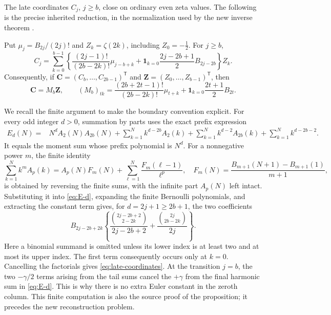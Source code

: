 The late coordinates $C_j$, $j\geq b$, close on ordinary even zeta
values. The following is the precise inherited reduction, in the
normalization used by the new inverse theorem
\cite[Sections 2--3]{incoming-bernoulli}.

\begin{proposition}
\label{prop:late-coordinates}
Put $\mu_j=B_{2j}/(2j)!$ and $Z_k=\zeta(2k)$, including
$Z_0=-\tfrac12$. For $j\geq b$,
\begin{equation}\label{eq:late-coordinates}
 C_j=\sum_{k=0}^{b-1}
 \left\{\frac{(2j-1)!}{(2b-2k)!}\mu_{j-b+k}
 +\mathbf1_{k=0}\frac{2j-2b+1}{2}B_{2j-2b}\right\}Z_k.
\end{equation}
Consequently, if $\mathbf C=(C_b,\ldots,C_{2b-1})^{\mathsf T}$ and
$\mathbf Z=(Z_0,\ldots,Z_{b-1})^{\mathsf T}$, then
\begin{equation}\label{eq:M-system}
 \mathbf C=M_b\mathbf Z,
 \qquad
 (M_b)_{tk}=\frac{(2b+2t-1)!}{(2b-2k)!}\mu_{t+k}
       +\mathbf1_{k=0}\frac{2t+1}{2}B_{2t}.
\end{equation}
\end{proposition}

We recall the finite argument to make the boundary convention explicit.
For every odd integer $d>0$, summation by parts uses the exact prefix
expression
\begin{align}\label{eq:E-d}
 E_d(N)={}&N^dA_2(N)A_{2b}(N)
 +\sum_{k=1}^N k^{d-2b}A_2(k)
 +\sum_{k=1}^N k^{d-2}A_{2b}(k)
 +\sum_{k=1}^N k^{d-2b-2}.
\end{align}
It equals the moment sum whose prefix polynomial is $N^d$.
For a nonnegative power $m$, the finite identity
\begin{equation}\label{eq:faulhaber-tail}
 \sum_{k=1}^N k^m A_p(k)
 =A_p(N)F_m(N)+\sum_{\ell=1}^N\frac{F_m(\ell-1)}{\ell^p},
 \quad F_m(N)=\frac{B_{m+1}(N+1)-B_{m+1}(1)}{m+1},
\end{equation}
is obtained by reversing the finite sums, with the infinite part
$A_p(N)$ left intact. Substituting it into \eqref{eq:E-d}, expanding
the finite Bernoulli polynomials, and extracting the constant term
gives, for $d=2j+1\geq2b+1$, the two coefficients
\[
 B_{2j-2b+2k}
 \left\{
 \frac{\binom{2j-2b+2}{2-2k}}{2j-2b+2}
 +\frac{\binom{2j}{2b-2k}}{2j}\right\}.
\]
Here a binomial summand is omitted unless its lower index is at
least two and at most its upper index. The first term consequently
occurs only at $k=0$. Cancelling the factorials gives
\eqref{eq:late-coordinates}. At the transition $j=b$, the two
$-\gamma/2$ terms arising from the tail sums cancel the $+\gamma$
from the final harmonic sum in \eqref{eq:E-d}. This is why there is
no extra Euler constant in the zeroth column. This finite computation
is also the source proof of the proposition; it precedes the new
reconstruction problem.

